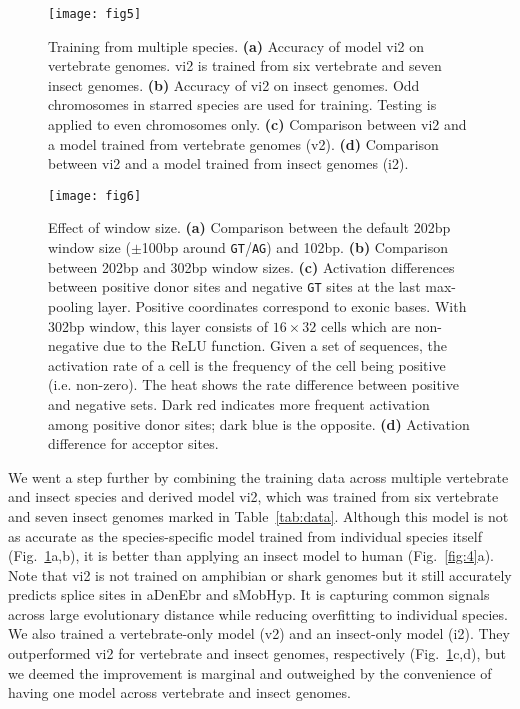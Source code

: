 \documentclass[webpdf,contemporary,large,namedate]{oup-authoring-template}%
\begin{document}
\begin{figure}[tb]
\texttt{[image: fig5]}
\caption{Training from multiple species.
{\bf (a)} Accuracy of model vi2 on vertebrate genomes. vi2 is trained from six vertebrate and seven insect genomes.
{\bf (b)} Accuracy of vi2 on insect genomes. Odd chromosomes in starred species are used for training.
Testing is applied to even chromosomes only.
{\bf (c)} Comparison between vi2 and a model trained from vertebrate genomes (v2).
{\bf (d)} Comparison between vi2 and a model trained from insect genomes (i2).}\label{fig:5}
\end{figure}

\begin{figure}[bt]
\texttt{[image: fig6]}
\caption{Effect of window size.
{\bf (a)} Comparison between the default 202bp window size ($\pm$100bp around {\tt GT}/{\tt AG}) and 102bp.
{\bf (b)} Comparison between 202bp and 302bp window sizes.
{\bf (c)} Activation differences between positive donor sites and negative {\tt GT} sites at the last max-pooling layer.
Positive coordinates correspond to exonic bases.
With 302bp window, this layer consists of $16\times32$ cells which are non-negative due to the ReLU function.
Given a set of sequences, the activation rate of a cell is the frequency of the cell being positive (i.e. non-zero).
The heat shows the rate difference between positive and negative sets.
Dark red indicates more frequent activation among positive donor sites; dark blue is the opposite.
{\bf (d)} Activation difference for acceptor sites.}\label{fig:6}
\end{figure}

We went a step further by combining the training data across multiple vertebrate and insect species
and derived model vi2, which was trained from six vertebrate and seven insect genomes marked in Table~\ref{tab:data}.
Although this model is not as accurate as the species-specific model trained from individual species itself (Fig.~\ref{fig:5}a,b),
it is better than applying an insect model to human (Fig.~\ref{fig:4}a).
Note that vi2 is not trained on amphibian or shark genomes but it still accurately predicts splice sites in aDenEbr and sMobHyp.
It is capturing common signals across large evolutionary distance while reducing overfitting to individual species.
We also trained a vertebrate-only model (v2) and an insect-only model (i2).
They outperformed vi2 for vertebrate and insect genomes, respectively (Fig.~\ref{fig:5}c,d),
but we deemed the improvement is marginal and outweighed by the convenience
of having one model across vertebrate and insect genomes.
\end{document}

